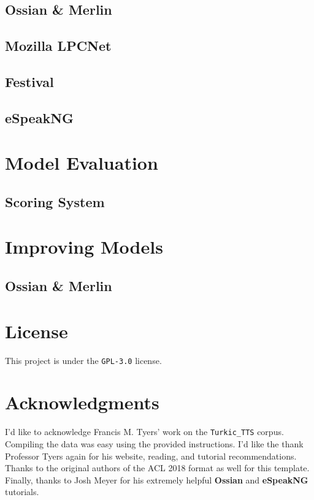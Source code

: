 \documentclass[11pt,a4paper]{article}
\begin{document}
\subsection{Ossian \& Merlin}
\subsection{Mozilla LPCNet}
\subsection{Festival}
\subsection{eSpeakNG}

\section{Model Evaluation}\label{ssec:evaluation}

\subsection{Scoring System}\label{ssec:score}

\section{Improving Models}\label{sec:improving}
\subsection{Ossian \& Merlin}\label{ssec:improveOssian}

\section*{License}
This project is under the \texttt{GPL-3.0} license.

\section*{Acknowledgments}
I'd like to acknowledge Francis M. Tyers' work on the \texttt{Turkic\_TTS} corpus. Compiling the data was easy using the provided instructions. I'd like the thank Professor Tyers again for his website, reading, and tutorial recommendations. Thanks to the original authors of the ACL 2018 format as well for this template. Finally, thanks to Josh Meyer for his extremely helpful \textbf{Ossian} and \textbf{eSpeakNG} tutorials.

%
%


\end{document}
